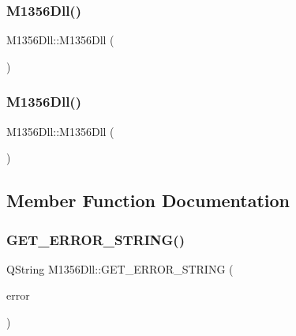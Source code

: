 \subsubsection{\texorpdfstring{M1356Dll()}{M1356Dll()}\hspace{0.1cm}{\footnotesize\ttfamily [1/2]}}
{\footnotesize\ttfamily M1356\+Dll\+::\+M1356\+Dll (\begin{DoxyParamCaption}{ }\end{DoxyParamCaption})}

\mbox{\label{class_m1356_dll_a38686d41a3476f15cf676795806aff7d}} 
\subsubsection{\texorpdfstring{M1356Dll()}{M1356Dll()}\hspace{0.1cm}{\footnotesize\ttfamily [2/2]}}
{\footnotesize\ttfamily M1356\+Dll\+::\+M1356\+Dll (\begin{DoxyParamCaption}{ }\end{DoxyParamCaption})}



\subsection{Member Function Documentation}
\mbox{\label{class_m1356_dll_ad35a73433e99eb6ccce5f3729f7ae283}} 
\subsubsection{\texorpdfstring{GET\_ERROR\_STRING()}{GET\_ERROR\_STRING()}\hspace{0.1cm}{\footnotesize\ttfamily [1/2]}}
{\footnotesize\ttfamily Q\+String M1356\+Dll\+::\+G\+E\+T\+\_\+\+E\+R\+R\+O\+R\+\_\+\+S\+T\+R\+I\+NG (\begin{DoxyParamCaption}\item[{Q\+String}]{error }\end{DoxyParamCaption})}

\mbox{\label{class_m1356_dll_ad35a73433e99eb6ccce5f3729f7ae283}} 
